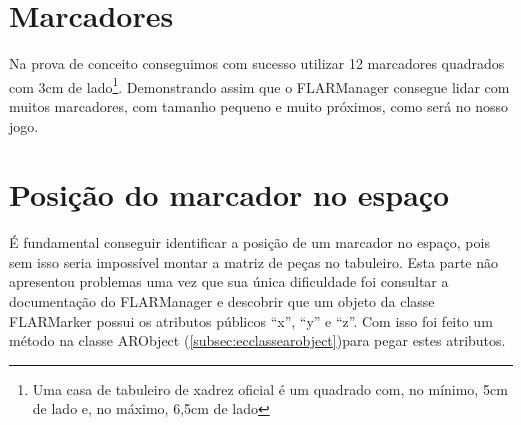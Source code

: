 \documentclass[a4paper,12pt]{book}
\begin{document}
		\section{Marcadores}
		\label{sec:pcmarcadores}
		Na prova de conceito conseguimos com sucesso utilizar 12 marcadores quadrados
		com 3cm de lado\footnote{Uma casa de tabuleiro de xadrez oficial \'e um
		quadrado com, no m\'inimo, 5cm de lado e, no m\'aximo, 6,5cm de lado}. Demonstrando assim que
		o FLARManager consegue lidar com muitos marcadores, com tamanho pequeno e muito pr\'oximos, como ser\'a no
		nosso jogo.
		
		\section{Posi\c c\~ao do marcador no espa\c co}
		\label{sec:pcposicaodomarcadornoespaco}
		\'E fundamental conseguir identificar a posi\c c\~ao de um marcador no espa\c
		co, pois sem isso seria imposs\'ivel montar a matriz de pe\c cas no tabuleiro.
		Esta parte n\~ao apresentou problemas uma vez que sua \'unica dificuldade foi
		consultar a documenta\c c\~ao do FLARManager e descobrir que um objeto da
		classe FLARMarker possui os atributos p\'ublicos ``x'', ``y'' e ``z''. Com
		isso foi feito um m\'etodo na classe ARObject
		(\ref{subsec:ecclassearobject})para pegar estes atributos.
		
\end{document}

